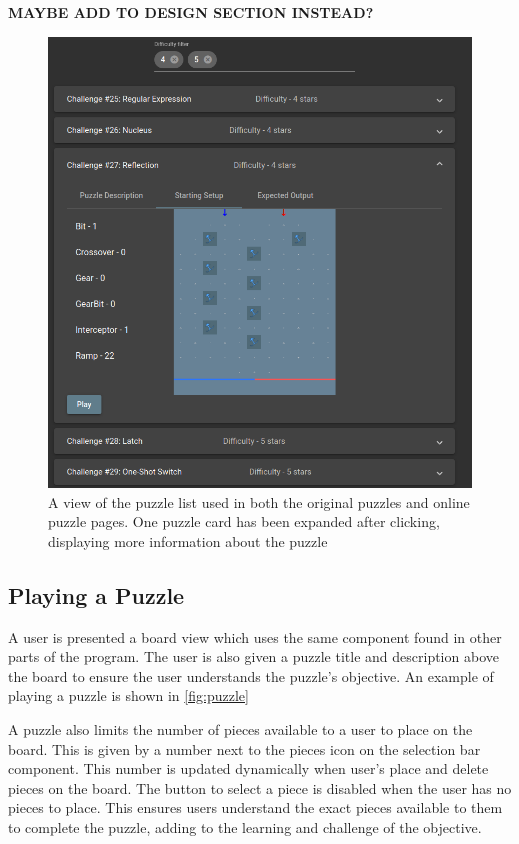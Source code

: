 \documentclass{l4proj}
\begin{document}
\textbf{MAYBE ADD TO DESIGN SECTION INSTEAD?}

\begin{figure}
    \centering
    \includegraphics[width=0.65\linewidth]{images/puzzleList.png}
    \caption{A view of the puzzle list used in both the original puzzles and online puzzle pages. One puzzle card has been expanded after clicking, displaying more information about the puzzle}
    \label{fig:puzzleList}
\end{figure}

\subsection{Playing a Puzzle}
A user is presented a board view which uses the same component found in other parts of the program. The user is also given a puzzle title and description above the board to ensure the user understands the puzzle's objective. An example of playing a puzzle is shown in \ref{fig:puzzle}

A puzzle also limits the number of pieces available to a user to place on the board. This is given by a number next to the pieces icon on the selection bar component. This number is updated dynamically when user's place and delete pieces on the board. The button to select a piece is disabled when the user has no pieces to place. This ensures users understand the exact pieces available to them to complete the puzzle, adding to the learning and challenge of the objective. 
\end{document}
